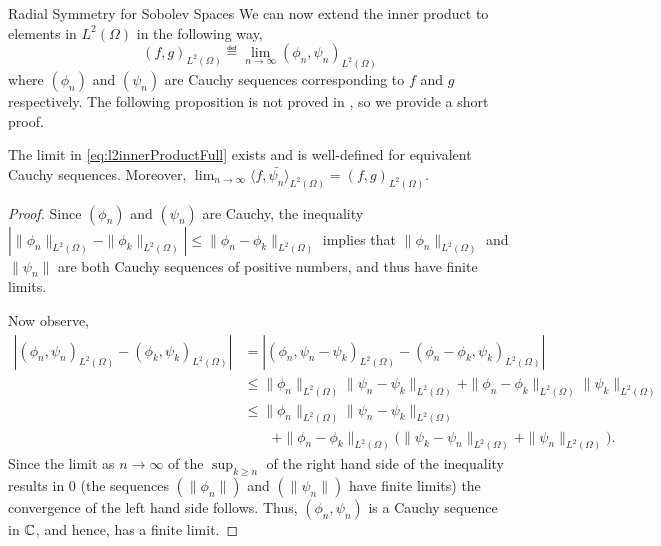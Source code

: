 \begin{chapter}{Radial Symmetry for Sobolev Spaces}
We can now extend the inner product to elements in $L^2(\Omega)$ in the following way,
\begin{equation} \label{eq:l2innerProductFull}
  (f,g)_{L^2(\Omega)} \eqdef \lim_{n\to\infty} (\phi_n,\psi_n)_{L^2(\Omega)}
\end{equation}
where $(\phi_n)$ and $(\psi_n)$ are Cauchy sequences corresponding to $f$ and $g$ respectively.
The following proposition is not proved in \citep{richtmyer1978principles}, so we provide a short proof.
\begin{prop}
  The limit in \eqref{eq:l2innerProductFull} exists and is well-defined for equivalent Cauchy sequences. 
  Moreover, $\lim_{n\to\infty} \langle f,\bar{\psi_n}\rangle _{L^2(\Omega)} = (f,g)_{L^2(\Omega)}$.
\end{prop}
\begin{proof}
  Since $(\phi_n)$ and $(\psi_n)$ are Cauchy, the inequality $|\|\phi_n\|_{L^2(\Omega)} - \|\phi_k\|_{L^2(\Omega)}| \le \|\phi_n - \phi_k\|_{L^2(\Omega)}$ implies that $\|\phi_n\|_{L^2(\Omega)}$ and $\|\psi_n\|$ are both Cauchy sequences of positive numbers, and thus have finite limits.

Now observe,
\begin{align}
  |(\phi_n,\psi_n)_{L^2(\Omega)} - (\phi_k,\psi_k)_{L^2(\Omega)}| 
    &= \left|(\phi_n,\psi_n-\psi_k)_{L^2(\Omega)} -(\phi_n-\phi_k,\psi_k)_{L^2(\Omega)}\right| \nonumber\\
    &\le \|\phi_n\|_{L^2(\Omega)}\|\psi_n-\psi_k\|_{L^2(\Omega)} + \|\phi_n - \phi_k\|_{L^2(\Omega)}\|\psi_k\|_{L^2(\Omega)} \nonumber\\
    &\le \|\phi_n\|_{L^2(\Omega)}\|\psi_n-\psi_k\|_{L^2(\Omega)} \nonumber\\
    &\quad\quad+ \|\phi_n - \phi_k\|_{L^2(\Omega)}\big(\|\psi_k - \psi_n\|_{L^2(\Omega)} + \|\psi_n\|_{L^2(\Omega)}\big).
\end{align}
  Since the limit as $n\to\infty$ of the $\sup_{k\ge n}$ of the right hand side of the inequality results in 0 (the sequences $(\|\phi_n\|)$ and $(\|\psi_n\|)$ have finite limits) the convergence of the left hand side follows.
Thus, $(\phi_n,\psi_n)$ is a Cauchy sequence in $\mathbb C$, and hence, has a finite limit.


\end{proof}
\end{chapter}
